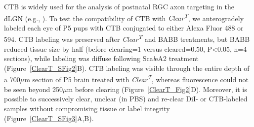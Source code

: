CTB is widely used for the analysis of postnatal RGC axon targeting in the dLGN (e.g., ).
To test the compatibility of CTB with \emph{Clear\textsuperscript{T}}, we anterogradely labeled each eye of P5 pups with CTB conjugated to either Alexa Fluor 488 or 594.
CTB labeling was preserved after \emph{Clear\textsuperscript{T}} and BABB treatments, but BABB reduced tissue size by half (before clearing=1 versus cleared=0.50, P<0.05, n=4 sections), while labeling was diffuse following Sca\emph{l}eA2 treatment (Figure~\ref{ClearT_SFig2}B).
CTB labeling was visible through the entire depth of a 700$\mu$m section of P5 brain treated with \emph{Clear\textsuperscript{T}}, whereas fluorescence could not be seen beyond 250$\mu$m before clearing (Figure~\ref{ClearT_Fig2}D).
Moreover, it is possible to successively clear, unclear (in PBS) and re-clear DiI- or CTB-labeled samples without compromising tissue or label integrity (Figure~\ref{ClearT_SFig3}A,B).
